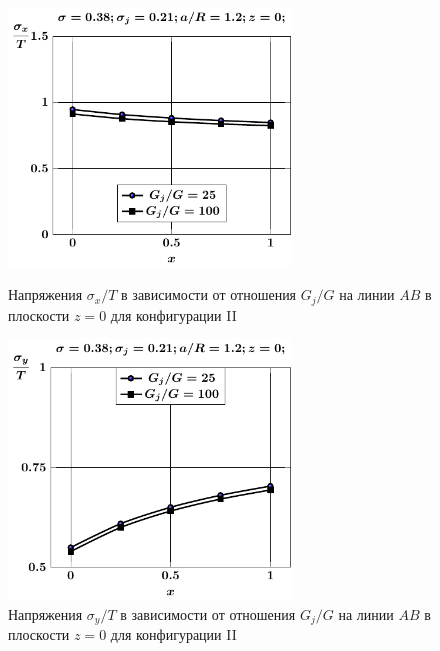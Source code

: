 \begin{russian}
%

\begin{figure}[h!]
\centering\footnotesize
\parbox[b]{7.5cm}{\centering\includegraphics[width=7.5cm]{inc2b-g-a12-h10-r10-z0-sig_x.pdf}
\caption{Напряжения $\sigma_x/T$ в зависимости от отношения $G_j/G$ на линии $AB$ в плоскости $z=0$ для конфигурации II
\label{f:7:51}}}\hfil\hfil
\parbox[b]{7.5cm}{\centering\includegraphics[width=7.5cm]{inc2b-g-a12-h10-r10-z0-sig_y.pdf}
\caption{Напряжения $\sigma_y/T$ в зависимости от отношения $G_j/G$ на линии $AB$ в плоскости $z=0$ для конфигурации II
\label{f:7:109}}}
\end{figure}


\end{russian}
